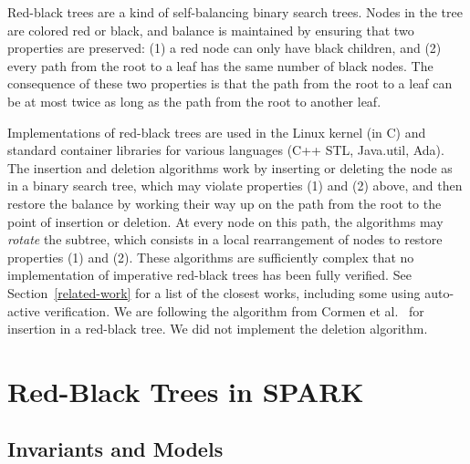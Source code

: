 \documentclass{llncs}
\newcommand{\spark}{SPARK\xspace}
\begin{document}
Red-black trees are a kind of self-balancing binary search trees. Nodes in the
tree are colored red or black, and balance is maintained by ensuring that two
properties are preserved: (1) a red node can only have black children, and (2)
every path from the root to a leaf has the same number of black nodes. The
consequence of these two properties is that the path from the root to a leaf
can be at most twice as long as the path from the root to another leaf.

Implementations of red-black trees are used in the Linux kernel (in C) and
standard container libraries for various languages (C++ STL, Java.util,
Ada). The insertion and deletion algorithms work by inserting or deleting the
node as in a binary search tree, which may violate properties (1) and (2)
above, and then restore the balance by working their way up on the path from
the root to the point of insertion or deletion. At every node on this path, the
algorithms may \emph{rotate} the subtree, which consists in a local
rearrangement of nodes to restore properties (1) and (2). These algorithms are
sufficiently complex that no implementation of imperative red-black trees has
been fully verified. See Section~\ref{related-work} for a list of the closest
works, including some using auto-active verification. We are following the
algorithm from Cormen et al.~\cite{Cormen2009} for insertion in a red-black
tree. We did not implement the deletion algorithm.

\section{Red-Black Trees in \spark}
\subsection{Invariants and Models}
\label{sec-rbt-inv}

\end{document}
